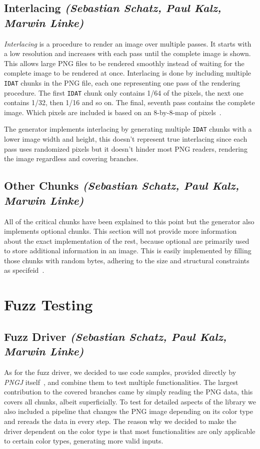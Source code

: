 \documentclass[runningheads]{llncs}
\begin{document}
\subsection{Interlacing \normalfont\textit{(Sebastian Schatz, Paul Kalz, Marwin Linke)}}
\label{interlacing}
\textit{Interlacing} is a procedure to render an image over multiple passes. It starts with a low resolution and increases with each pass until the complete image is shown.
This allows large PNG files to be rendered smoothly instead of waiting for the complete image to be rendered at once.
Interlacing is done by including multiple \texttt{IDAT} chunks in the PNG file, each one representing one pass of the rendering procedure.
The first \texttt{IDAT} chunk only contains 1/64 of the pixels, the next one contains 1/32, then 1/16 and so on. The final, seventh pass contains the complete image.
Which pixels are included is based on an 8-by-8-map of pixels~\cite{libpng_data_representation}.

The generator implements interlacing by generating multiple \texttt{IDAT} chunks with a lower image width and height, this doesn't represent true interlacing since each pass uses randomized pixels but it doesn't hinder most PNG readers, rendering the image regardless and covering branches.
\subsection{Other Chunks \normalfont\textit{(Sebastian Schatz, Paul Kalz, Marwin Linke)}}
All of the critical chunks have been explained to this point but the generator also implements optional chunks. 
This section will not provide more information about the exact implementation of the rest, because optional are primarily used to store additional information in an image.
This is easily implemented by filling those chunks with random bytes, adhering to the size and structural constraints as specifeid~\cite{libpng_chunks}.
\section{Fuzz Testing}
\subsection{Fuzz Driver \normalfont\textit{(Sebastian Schatz, Paul Kalz, Marwin Linke)}}
As for the fuzz driver, we decided to use code samples, provided directly by \textit{PNGJ} itself~\cite{PNGJ_samples}, and combine them to test multiple functionalities.
The largest contribution to the covered branches came by simply reading the PNG data, this covers all chunks, albeit superficially.
To test for detailed aspects of the library we also included a pipeline that changes the PNG image depending on its color type and rereads the data in every step.
The reason why we decided to make the driver dependent on the color type is that most functionalities are only applicable to certain color types, generating more valid inputs.
\end{document}
